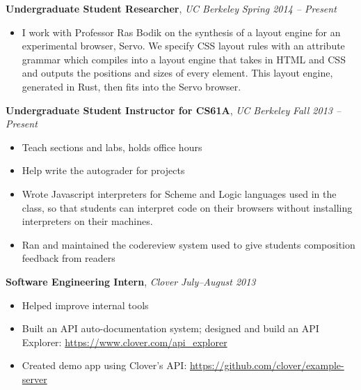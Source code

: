 \documentclass[9pt]{article}
\newenvironment{changemargin}[2]{%
  \begin{list}{}{%
      \setlength{\topsep}{0pt}%
      \setlength{\leftmargin}{#1}%
      \setlength{\rightmargin}{#2}%
      \setlength{\listparindent}{\parindent}%
      \setlength{\itemindent}{\parindent}%
      \setlength{\parsep}{\parskip}%
    }%
  \item[]}{\end{list}
}
\newenvironment{body} {
  \vspace*{-16pt}
  \begin{changemargin}{-0.25in}{-0.5in}
  }
  {\end{changemargin}
}
\begin{document}
\begin{body}
  \vspace{14pt}

  \textbf{Undergraduate Student Researcher}, \emph{UC Berkeley} \hfill \emph{Spring 2014 -- Present}\\
  \vspace*{-4pt}
  \begin{itemize} \itemsep -0pt  %
  \item I work with Professor Ras Bodik on the synthesis of a layout engine for
    an experimental browser, Servo. We specify CSS layout rules with an
    attribute grammar which compiles into a layout engine that takes in HTML and
    CSS and outputs the positions and sizes of every element. This layout
    engine, generated in Rust, then fits into the Servo browser.
  \end{itemize}

  \textbf{Undergraduate Student Instructor for CS61A}, \emph{UC Berkeley} \hfill \emph{Fall 2013 -- Present}\\
  \vspace*{-4pt}
  \begin{itemize} \itemsep -0pt  %
  \item Teach sections and labs, holds office hours
  \item Help write the autograder for projects
  \item Wrote Javascript interpreters for Scheme and Logic languages used in the
    class, so that students can interpret code on their browsers without
    installing interpreters on their machines.
  \item Ran and maintained the codereview system used to give students
    composition feedback from readers
  \end{itemize}

  \textbf{Software Engineering Intern}, \emph{Clover} \hfill \emph{July--August 2013}\\
  \vspace*{-4pt}
  \begin{itemize} \itemsep -0pt  %
  \item Helped improve internal tools
  \item Built an API auto-documentation system; designed and build an API     Explorer: \url{https://www.clover.com/api_explorer}
  \item Created demo app using Clover's API:     \url{https://github.com/clover/example-server}
  \end{itemize}


\end{body}
\end{document}
